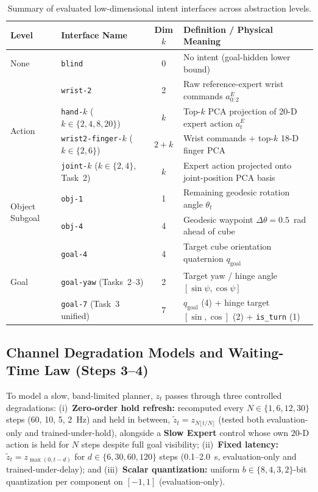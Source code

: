 \begin{table}[t]
  \centering
  \caption{Summary of evaluated low-dimensional intent interfaces across abstraction levels.}
  \label{tab:intent_taxonomy}
  \small
  \begin{tabular}{llcl}
    \toprule
    Level & Interface Name & Dim $k$ & Definition / Physical Meaning \\
    \midrule
    None & \texttt{blind} & 0 & No intent (goal-hidden lower bound) \\
    \multirow{4}{*}{Action} & \texttt{wrist-2} & 2 & Raw reference-expert wrist commands $a^E_{0:2}$ \\
     & \texttt{hand-$k$} ($k \in \{2,4,8,20\}$) & $k$ & Top-$k$ PCA projection of 20-D expert action $a^E_t$ \\
     & \texttt{wrist2-finger-$k$} ($k \in \{2,6\}$) & $2+k$ & Wrist commands + top-$k$ 18-D finger PCA \\
     & \texttt{joint-$k$} ($k \in \{2,4\}$, Task~2) & $k$ & Expert action projected onto joint-position PCA basis \\
    \multirow{2}{*}{Object Subgoal} & \texttt{obj-1} & 1 & Remaining geodesic rotation angle $\theta_t$ \\
     & \texttt{obj-4} & 4 & Geodesic waypoint $\Delta\theta=0.5$~rad ahead of cube \\
    \multirow{3}{*}{Goal} & \texttt{goal-4} & 4 & Target cube orientation quaternion $q_{\mathrm{goal}}$ \\
     & \texttt{goal-yaw} (Tasks~2--3) & 2 & Target yaw / hinge angle $[\sin\psi, \cos\psi]$ \\
     & \texttt{goal-7} (Task~3 unified) & 7 & $q_{\mathrm{goal}}$ (4) + hinge target $[\sin,\cos]$ (2) + \texttt{is\_turn} (1) \\
    \bottomrule
  \end{tabular}
\end{table}

\subsection{Channel Degradation Models and Waiting-Time Law (Steps 3--4)}
\label{sec:method_channel}
To model a slow, band-limited planner, $z_t$ passes through three controlled degradations:
(i)~\textbf{Zero-order hold refresh:} recomputed every $N \in \{1, 6, 12, 30\}$ steps (60, 10, 5, 2~Hz) and held in between, $\tilde{z}_t = z_{N \lfloor t/N \rfloor}$ (tested both evaluation-only and trained-under-hold), alongside a \textbf{Slow Expert} control whose own 20-D action is held for $N$ steps despite full goal visibility;
(ii)~\textbf{Fixed latency:} $\tilde{z}_t = z_{\max(0, t-d)}$ for $d \in \{6, 30, 60, 120\}$ steps (0.1--2.0~s, evaluation-only and trained-under-delay); and
(iii)~\textbf{Scalar quantization:} uniform $b \in \{8, 4, 3, 2\}$-bit quantization per component on $[-1,1]$ (evaluation-only).

